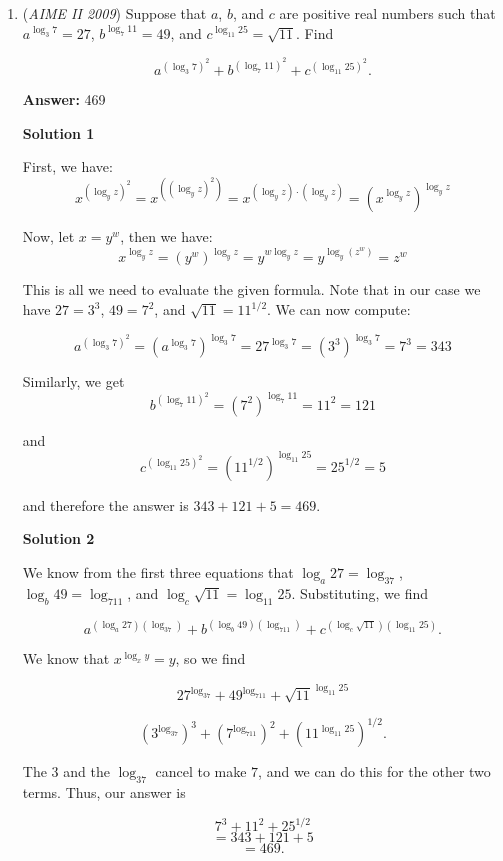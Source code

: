 \begin{enumerate}
	\item (\textit{AIME II 2009}) Suppose that $a$, $b$, and $c$ are positive real numbers such that $a^{\log_3 7} = 27$, $b^{\log_7 11} = 49$, and $c^{\log_{11}25} = \sqrt{11}$. Find

 \[a^{(\log_3 7)^2} + b^{(\log_7 11)^2} + c^{(\log_{11} 25)^2}.\]

 \textbf{Answer: }469



\textbf{Solution 1}

First, we have:
 \[x^{(\log_y z)^2} = x^{\left( (\log_y z)^2 \right) } = x^{(\log_y z) \cdot (\log_y z) } = \left( x^{\log_y z} \right)^{\log_y z}\]

 Now, let $x=y^w$, then we have:
 \[x^{\log_y z}  = \left( y^w \right)^{\log_y z}  = y^{w\log_y z}  = y^{\log_y (z^w)}  = z^w\]

 This is all we need to evaluate the given formula. Note that in our case we have $27=3^3$, $49=7^2$, and $\sqrt{11}=11^{1/2}$. We can now compute:

 
 \[a^{(\log_3 7)^2} = \left( a^{\log_3 7} \right)^{\log_3 7} = 27^{\log_3 7} = (3^3)^{\log_3 7} = 7^3 = 343\]

 Similarly, we get
 \[b^{(\log_7 11)^2}  = (7^2)^{\log_7 11} = 11^2  = 121\]

 and
 \[c^{(\log_{11} 25)^2} = (11^{1/2})^{\log_{11} 25} = 25^{1/2} = 5\]

 and therefore the answer is $343+121+5 = \boxed{469}$.

 



\textbf{Solution 2}

We know from the first three equations that $\log_a27 = \log_37$, $\log_b49 = \log_711$, and $\log_c\sqrt{11} = \log_{11}25$. Substituting, we find

 
 \[a^{(\log_a27)(\log_37)} + b^{(\log_b49)(\log_711)} + c^{(\log_c\sqrt {11})(\log_{11}25)}.\]

 We know that $x^{\log_xy} =y$, so we find

 
 \[27^{\log_37} + 49^{\log_711} + \sqrt {11}^{\log_{11}25}\]

 \[(3^{\log_37})^3 + (7^{\log_711})^2 + ({11^{\log_{11}25}})^{1/2}.\]

 The $3$ and the $\log_37$ cancel to make $7$, and we can do this for the other two terms. Thus, our answer is

 
 \[7^3 + 11^2 + 25^{1/2}\]
 \[= 343 + 121 + 5\]
 \[= \boxed {469}.\]





\end{enumerate}
